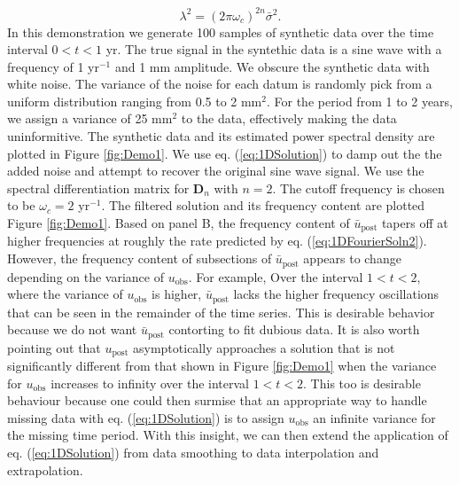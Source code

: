\documentclass[10pt,a4paper]{article}
\begin{document}
\begin{equation}\label{eq:VariableChange2}
\lambda^2 = (2\pi\omega_c)^{2n}\bar{\sigma}^2.  
\end{equation}
In this demonstration we generate 100 samples of synthetic data over the time interval $0<t<1$ yr.  The true signal in the syntethic data is a sine wave with a frequency of 1 yr$^{-1}$ and 1 mm amplitude.  We obscure the synthetic data with white noise.  The variance of the noise for each datum is randomly pick from a uniform distribution ranging from 0.5 to 2 mm$^2$.  For the period from 1 to 2 years, we assign a variance of 25 mm$^2$ to the data, effectively making the data uninformitive.  The synthetic data and its estimated power spectral density are plotted in Figure \ref{fig:Demo1}.  We use eq. (\ref{eq:1DSolution}) to damp out the the added noise and attempt to recover the original sine wave signal.  We use the spectral differentiation matrix for $\mathbf{D}_n$ with $n=2$.  The cutoff frequency is chosen to be $\omega_c=2$ yr$^{-1}$.  The filtered solution and its frequency content are plotted Figure \ref{fig:Demo1}.  Based on panel B, the frequency content of $\bar{u}_\mathrm{post}$ tapers off at higher frequencies at roughly the rate predicted by eq. (\ref{eq:1DFourierSoln2}). However, the frequency content of subsections of $\bar{u}_\mathrm{post}$ appears to change depending on the variance of $u_\mathrm{obs}$. For example, Over the interval $1<t<2$, where the variance of $u_\mathrm{obs}$ is higher, $\bar{u}_\mathrm{post}$ lacks the higher frequency oscillations that can be seen in the remainder of the time series. This is desirable behavior because we do not want $\bar{u}_\mathrm{post}$ contorting to fit dubious data.  It is also worth pointing out that $u_\mathrm{post}$ asymptotically approaches a solution that is not significantly different from that shown in Figure \ref{fig:Demo1} when the variance for $u_\mathrm{obs}$ increases to infinity over the interval $1<t<2$.  This too is desirable behaviour because one could then surmise that an appropriate way to handle missing data with eq. (\ref{eq:1DSolution}) is to assign $u_\mathrm{obs}$ an infinite variance for the missing time period.  With this insight, we can then extend the application of eq. (\ref{eq:1DSolution}) from data smoothing to data interpolation and extrapolation.   
\end{document}
